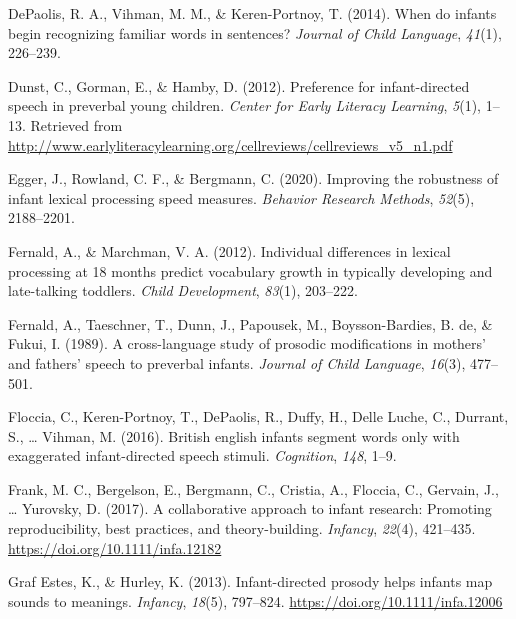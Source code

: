 \documentclass[
  man,floatsintext]{apa6}
\newlength{\cslhangindent}
\newlength{\cslentryspacingunit} %
\newenvironment{CSLReferences}[2] %
 {%
  \setlength{\parindent}{0pt}
  \ifodd #1
  \let\oldpar\par
  \def\par{\hangindent=\cslhangindent\oldpar}
  \fi
  \setlength{\parskip}{#2\cslentryspacingunit}
 }%
 {}
\begin{document}
\begin{CSLReferences}{1}{0}
\leavevmode{}%
DePaolis, R. A., Vihman, M. M., \& Keren-Portnoy, T. (2014). When do infants begin recognizing familiar words in sentences? \emph{Journal of Child Language}, \emph{41}(1), 226--239.

\leavevmode{}%
Dunst, C., Gorman, E., \& Hamby, D. (2012). Preference for infant-directed speech in preverbal young children. \emph{Center for Early Literacy Learning}, \emph{5}(1), 1--13. Retrieved from \url{http://www.earlyliteracylearning.org/cellreviews/cellreviews_v5_n1.pdf}

\leavevmode{}%
Egger, J., Rowland, C. F., \& Bergmann, C. (2020). Improving the robustness of infant lexical processing speed measures. \emph{Behavior Research Methods}, \emph{52}(5), 2188--2201.

\leavevmode{}%
Fernald, A., \& Marchman, V. A. (2012). Individual differences in lexical processing at 18 months predict vocabulary growth in typically developing and late-talking toddlers. \emph{Child Development}, \emph{83}(1), 203--222.

\leavevmode{}%
Fernald, A., Taeschner, T., Dunn, J., Papousek, M., Boysson-Bardies, B. de, \& Fukui, I. (1989). A cross-language study of prosodic modifications in mothers' and fathers' speech to preverbal infants. \emph{Journal of Child Language}, \emph{16}(3), 477--501.

\leavevmode{}%
Floccia, C., Keren-Portnoy, T., DePaolis, R., Duffy, H., Delle Luche, C., Durrant, S., \ldots{} Vihman, M. (2016). British english infants segment words only with exaggerated infant-directed speech stimuli. \emph{Cognition}, \emph{148}, 1--9.

\leavevmode{}%
Frank, M. C., Bergelson, E., Bergmann, C., Cristia, A., Floccia, C., Gervain, J., \ldots{} Yurovsky, D. (2017). A collaborative approach to infant research: Promoting reproducibility, best practices, and theory-building. \emph{Infancy}, \emph{22}(4), 421--435. \url{https://doi.org/10.1111/infa.12182}

\leavevmode{}%
Graf Estes, K., \& Hurley, K. (2013). Infant-directed prosody helps infants map sounds to meanings. \emph{Infancy}, \emph{18}(5), 797--824. \url{https://doi.org/10.1111/infa.12006}


\end{CSLReferences}
\end{document}
